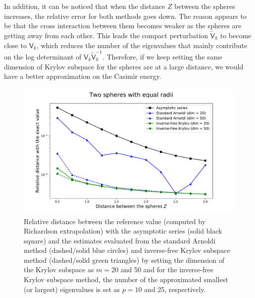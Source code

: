 In addition, it can be noticed that when the distance $Z$ between the spheres increases, the relative error 
for both methods goes down. The reason appears to be that the cross interaction between them becomes weaker as the spheres are getting away from each other. 
This leads the compact perturbation $\tilde{\mathsf{V}}_{k}$ to become close to $\mathsf{V}_{k}$, which reduces the number of the eigenvalues that mainly 
contribute on the log determinant of $\mathsf{V}_{k}\tilde{\mathsf{V}}_{k}^{-1}$. Therefore, if we keep setting the same dimension of Krylov subspace 
for the spheres are at a large distance, we would have a better approximation on the Casimir energy.


\begin{figure}[H]
    \includegraphics[scale = 0.7]{figures/relative_distance_equal_radii.pdf}
    \caption{Relative distance between the reference value (computed by Richardson extrapolation) with the asymptotic series (solid black square)  
    and the estimates evaluated from the standard Arnoldi method (dashed/solid blue circles) and inverse-free Krylov subspace method (dashed/solid green triangles) 
    by setting the dimension of the Krylov subspace as $m = 20$ and 50 and for the inverse-free
    Krylov subspace method, the number of the approximated smallest (or largest) eigenvalues is set as $p = 10$ and 25, respectively.}
    \label{equal_radii_rel_dist}
\end{figure}
 
